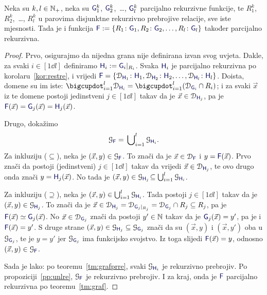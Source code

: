 \begin{teorem}\label{tm:gre}
Neka su $k,l\in{\mathbb N}_+$, neka su $\f G_1^k$, $\f G_2^k$,~\ldots, $\f G_l^k$ parcijalno rekurzivne funkcije, te $R_1^k$, $R_2^k$,~\ldots, $R_l^k$ u parovima disjunktne rekurzivno prebrojive relacije, sve iste mjesnosti. Tada je i funkcija $\f F:=\{R_1\colon\f G_1,R_2\colon\f G_2,\dotsc,R_l\colon\f G_l\}$ također parcijalno rekurzivna.
\end{teorem}
\begin{proof}
Prvo, osigurajmo da nijedna grana nije definirana izvan svog uvjeta. Dakle, za svaki $i\in[1\dd l]$ definiramo $\f H_i:=\f G_i|_{R_i}$. Svaka $\f H_i$ je parcijalno rekurzivna po korolaru~\ref{kor:restre}, i vrijedi $\f F=\{\dom{\f H_1}\colon\f H_1,\dom{\f H_2}\colon\f H_2,\dotsc,\dom{\f H_l}\colon\f H_l\}$. Doista, domene su im iste: $\bdcup_{i=1}^l\dom{\f H_i}=\bdcup_{i=1}^l(\dom{\f G_i}\cap R_i)$; i za svaki $\vec x$ iz te domene postoji jedinstveni $j\in[1\dd l]$ takav da je $\vec x\in\dom{\f H_{j}}$, pa je $\f F(\vec x)=\f G_{j}(\vec x)=\f H_{j}(\vec x)$.

Drugo, dokažimo
\begin{equation}
    \graf{\f F}=\,\bigcup\nolimits_{i=1}^l\graf{\f H_i}\text.
\end{equation}
Za inkluziju ($\subseteq$), neka je $(\vec x,y)\in\graf{\f F}$. To znači da je $\vec x\in\dom{\f F}$ i $y=\f F(\vec x)$. Prvo znači da postoji (jedinstveni) $j\in[1\dd l]$ takav da vrijedi $\vec x\in\dom{\f H_{j}}$, te ovo drugo onda znači $y=\f H_{j}(\vec x)$. No tada je $(\vec x,y)\in\graf{\f H_{j}}\!\subseteq\bigcup_{i=1}^l\graf{\f H_i}$.

Za inkluziju ($\supseteq$), neka je $(\vec x,y)\in\bigcup_{i=1}^l\graf{\f H_i}$. Tada postoji $j\in[1\dd l]$ takav da je $(\vec x,y)\in\graf{\f H_j}$. To znači da je $\vec x\in\dom{\f H_j}=\dom{\f G_j|_{R_j}}=\dom{\f G_j}\cap R_j\subseteq R_j$, pa je $\f F(\vec x)\simeq\f G_j(\vec x)$. No $\vec x\in\dom{\f G_j}$ znači da postoji $y'\in{\mathbb N}$ takav da je $\f G_j(\vec x)=y'$, pa je i $\f F(\vec x)=y'$. S druge strane $(\vec x,y)\in\graf{\f H_j}\subseteq\graf{\f G_j}$ znači da su $(\vec x,y)$ i $(\vec x,y')$ oba u $\graf{\f G_j}$, te je $y=y'$ jer $\graf{\f G_j}$ ima funkcijsko svojstvo. Iz toga slijedi $\f F(\vec x)=y$, odnosno $(\vec x,y)\in\graf{\f F}$.

Sada je lako: po teoremu~\ref{tm:grafprre}, svaki $\graf{\f H_i}$ je rekurzivno prebrojiv. Po propoziciji~\ref{pp:unlre}, $\graf{\f F}$ je rekurzivno prebrojiv. I za kraj, onda je $\f F$ parcijalno rekurzivna po teoremu~\ref{tm:graf}.
\end{proof}

